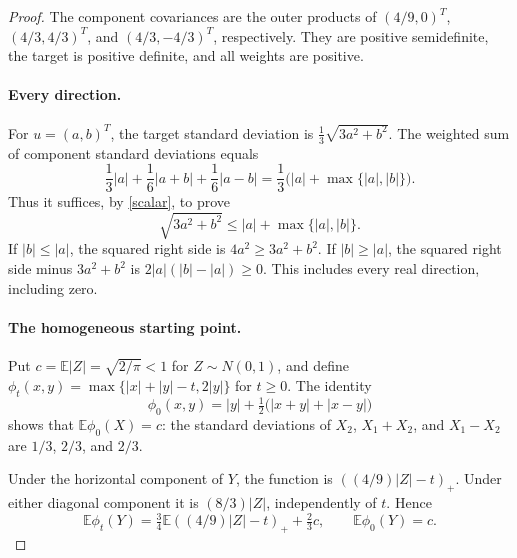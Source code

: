 \documentclass[11pt]{article}
\newcommand{\E}{\mathbb E}
\begin{document}
\begin{proof}
The component covariances are the outer products of $(4/9,0)^T$, $(4/3,4/3)^T$, and $(4/3,-4/3)^T$, respectively. They are positive semidefinite, the target is positive definite, and all weights are positive.

\paragraph{Every direction.}
For $u=(a,b)^T$, the target standard deviation is $\frac13\sqrt{3a^2+b^2}$. The weighted sum of component standard deviations equals
\[
 \frac13|a|+\frac16|a+b|+\frac16|a-b|
 =\frac13\bigl(|a|+\max\{|a|,|b|\}\bigr).
\]
Thus it suffices, by \eqref{scalar}, to prove
\begin{equation}\label{directions}
 \sqrt{3a^2+b^2}\le |a|+\max\{|a|,|b|\}.
\end{equation}
If $|b|\le|a|$, the squared right side is $4a^2\ge3a^2+b^2$. If $|b|\ge|a|$, the squared right side minus $3a^2+b^2$ is $2|a|(|b|-|a|)\ge0$. This includes every real direction, including zero.

\paragraph{The homogeneous starting point.}
Put $c=\E|Z|=\sqrt{2/\pi}<1$ for $Z\sim N(0,1)$, and define $\phi_t(x,y)=\max\{|x|+|y|-t,2|y|\}$ for $t\ge0$. The identity
\[
 \phi_0(x,y)=|y|+\tfrac12\bigl(|x+y|+|x-y|\bigr)
\]
shows that $\E\phi_0(X)=c$: the standard deviations of $X_2$, $X_1+X_2$, and $X_1-X_2$ are $1/3$, $2/3$, and $2/3$.

Under the horizontal component of $Y$, the function is $((4/9)|Z|-t)_+$. Under either diagonal component it is $(8/3)|Z|$, independently of $t$. Hence
\begin{equation}\label{mixture-expectation}
 \E\phi_t(Y)=\tfrac34\E((4/9)|Z|-t)_++\tfrac23 c,
 \qquad \E\phi_0(Y)=c.
\end{equation}


\end{proof}
\end{document}
